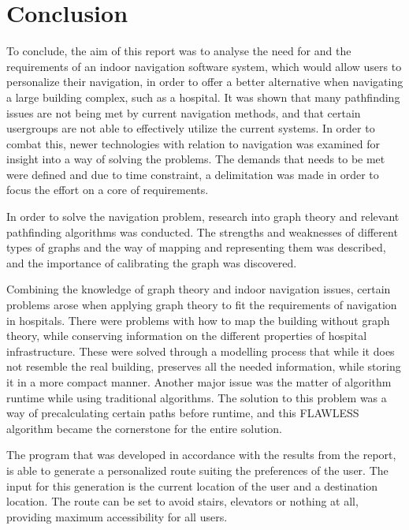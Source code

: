 \chapter{Conclusion}

To conclude, the aim of this report was to analyse the need for and the requirements of an indoor navigation software system, which would allow users to personalize their navigation, in order to offer a better alternative when navigating a large building complex, such as a hospital. It was shown that many pathfinding issues are not being met by current navigation methods, and that certain usergroups are not able to effectively utilize the current systems. In order to combat this, newer technologies with relation to navigation was examined for insight into a way of solving the problems. The demands that needs to be met were defined and due to time constraint, a delimitation was made in order to focus the effort on a core of requirements.

In order to solve the navigation problem, research into graph theory and relevant pathfinding algorithms was conducted. The strengths and weaknesses of different types of graphs and the way of mapping and representing them was described, and the importance of calibrating the graph was discovered. 

Combining the knowledge of graph theory and indoor navigation issues, certain problems arose when applying graph theory to fit the requirements of navigation in hospitals. There were problems with how to map the building without graph theory, while conserving information on the different properties of hospital infrastructure. These were solved through a modelling process that while it does not resemble the real building, preserves all the needed information, while storing it in a more compact manner. Another major issue was the matter of algorithm runtime while using traditional algorithms. The solution to this problem was a way of precalculating certain paths before runtime, and this FLAWLESS algorithm became the cornerstone for the entire solution.

The program that was developed in accordance with the results from the report, is able to generate a personalized route suiting the preferences of the user. The input for this generation is the current location of the user and a destination location. The route can be set to avoid stairs, elevators or nothing at all, providing maximum accessibility for all users.